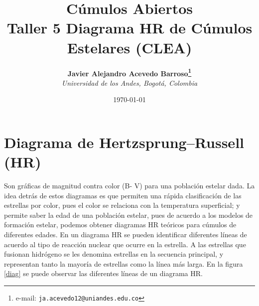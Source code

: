 \documentclass[12pt]{article}
\begin{document}
\title{Cúmulos Abiertos \\ Taller 5 Diagrama HR de Cúmulos Estelares (CLEA)}

\author{
\textbf{Javier Alejandro Acevedo Barroso\thanks{e-mail: \texttt{ja.acevedo12@uniandes.edu.co}}}\\
\textit{Universidad de los Andes, Bogotá, Colombia}\\
 }%

\date{\today}
\maketitle %


\normalsize
\newpage


\section{Diagrama de Hertzsprung–Russell (HR)}
Son gráficas de magnitud contra color (B- V) para una población estelar dada.
La idea detrás de estos diagramas es que permiten una rápida clasificación de las estrellas por color, pues el color se relaciona con la temperatura superficial; y permite saber la edad de una población estelar, pues de acuerdo a los modelos de formación estelar, podemos obtener diagramas HR teóricos para cúmulos de diferentes edades.
En un diagrama HR se pueden identificar diferentes líneas de acuerdo al tipo de reacción nuclear que ocurre en la estrella.
A las estrellas que fusionan hidrógeno se les denomina estrellas en la secuencia principal, y representan tanto la mayoría de estrellas como la línea más larga. En la figura \ref{diag} se puede observar las diferentes líneas de un diagrama HR.
\end{document}
